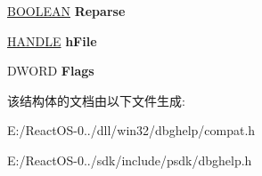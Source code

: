 \begin{DoxyCompactItemize}
\item 
\mbox{\label{struct___i_m_a_g_e_h_l_p___d_e_f_e_r_r_e_d___s_y_m_b_o_l___l_o_a_d_w64_a607ed8e4de0804df619879a55cd34f86}} 
\hyperlink{_processor_bind_8h_a112e3146cb38b6ee95e64d85842e380a}{B\+O\+O\+L\+E\+AN} {\bfseries Reparse}
\item 
\mbox{\label{struct___i_m_a_g_e_h_l_p___d_e_f_e_r_r_e_d___s_y_m_b_o_l___l_o_a_d_w64_a35a13a2fb5a7323c9e7e2939132bcb1f}} 
\hyperlink{interfacevoid}{H\+A\+N\+D\+LE} {\bfseries h\+File}
\item 
\mbox{\label{struct___i_m_a_g_e_h_l_p___d_e_f_e_r_r_e_d___s_y_m_b_o_l___l_o_a_d_w64_a133f348fc88098d68708344552cad6e3}} 
D\+W\+O\+RD {\bfseries Flags}
\end{DoxyCompactItemize}


该结构体的文档由以下文件生成\+:\begin{DoxyCompactItemize}
\item 
E\+:/\+React\+O\+S-\/0../dll/win32/dbghelp/compat.\+h\item 
E\+:/\+React\+O\+S-\/0../sdk/include/psdk/dbghelp.\+h\end{DoxyCompactItemize}
